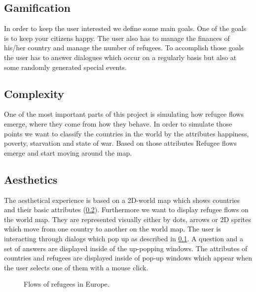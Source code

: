 \documentclass{acm_proc_article-sp}
\begin{document}
\subsection{Gamification}
\label{gamification}
In order to keep the user interested we define some main goals. One of the goals is to keep your citizens happy. The user also has to manage the finances of his/her country and manage the number of refugees. To accomplish those goals the user has to answer dialogues which occur on a regularly basis but also at some randomly generated special events. 
\subsection{Complexity}
\label{complexity}
One of the most important parts of this project is simulating how refugee flows emerge, where they come from how they behave. In order to simulate those points we want to classify the countries in the world by the attributes happiness, poverty, starvation and state of war. Based on those attributes Refugee flows emerge and start moving around the map.
\subsection{Aesthetics}
The aesthetical experience is based on a 2D-world map which shows countries and their basic attributes (\ref{complexity}). Furthermore we want to display refugee flows on the world map. They are represented visually  either  by dots, arrows or 2D sprites which move from one country to another on the world map. The user is interacting through dialogs which pop up as described in \ref{gamification}. A question and a set of answers are displayed inside of the up-popping windows. The attributes of countries and refugees are displayed inside of pop-up windows which appear when the user selects one of them with a mouse click.

\begin{figure}
\centering
{}
\caption{Flows of refugees in Europe.}
\label{europe}
\end{figure}
\end{document}
